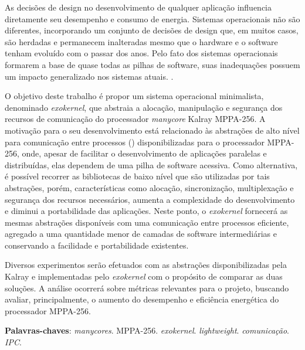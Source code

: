 \documentclass[
	12pt,				%
	openright,			%
	twoside,			%
	a4paper,			%
	english,			%
	brazil,				%
	]{abntex2}
\begin{document}
\begin{resumo}

    As decisões de design no desenvolvimento de qualquer aplicação influencia
    diretamente seu desempenho e consumo de energia.
    Sistemas operacionais não são diferentes, incorporando um conjunto de
    decisões de design que, em muitos casos, são herdadas e permanecem
    inalteradas mesmo que o hardware e o software tenham evoluído com o
    passar dos anos.
    Pelo fato dos sistemas operacionais formarem a base de quase todas as
    pilhas de software, suas inadequações possuem um impacto generalizado
    nos sistemas atuais. \cite{hunt_singularity:_2007}. 
    
    O objetivo deste trabalho é propor um sistema operacional minimalista,
    denominado \textit{exokernel}, que abstraia a alocação, manipulação e
    segurança dos recursos de comunicação do processador \textit{manycore} 
    Kalray MPPA-256.
    A motivação para o seu desenvolvimento está relacionado às abstrações
    de alto nível para comunicação entre processos (\ipc) disponibilizadas
    para o processador MPPA-256, onde, apesar de facilitar o desenvolvimento
    de aplicações paralelas e distribuídas, elas dependem de uma pilha de
    software acessiva.
    Como alternativa, é possível recorrer as bibliotecas de baixo nível que
    são utilizadas por tais abstrações, porém, características como alocação,
    sincronização, multiplexação e segurança dos recursos necessários,
    aumenta a complexidade do desenvolvimento e diminui a portabilidade das
    aplicações.
    Neste ponto, o \textit{exokernel} fornecerá as mesmas abstrações \ipc
    disponíveis com uma comunicação entre processos eficiente, agregado a
    uma quantidade menor de camadas de software intermediárias e conservando
    a facilidade e portabilidade existentes.
    
    Diversos experimentos serão efetuados com as abstrações disponibilizadas
    pela Kalray e implementadas pelo \textit{exokernel} com o propósito de
    comparar as duas soluções.
    A análise ocorrerá sobre métricas relevantes para o projeto, buscando
    avaliar, principalmente, o aumento do desempenho e eficiência energética
    do processador MPPA-256.

 \vspace{\onelineskip}
    
 \noindent
 \textbf{Palavras-chaves}: \textit{manycores}. MPPA-256. \textit{exokernel}. \textit{lightweight}. \textit{comunicação}. \textit{IPC}.
\end{resumo}
\end{document}
